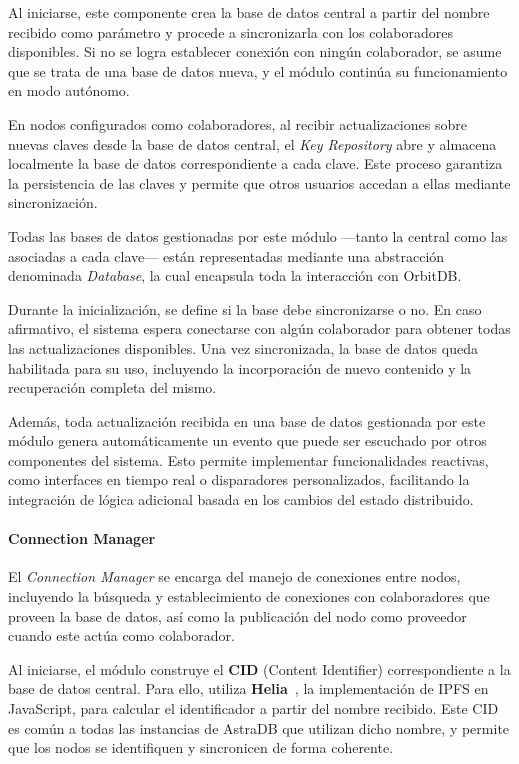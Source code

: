 Al iniciarse, este componente crea la base de datos central a partir del nombre recibido como parámetro y procede a sincronizarla con los colaboradores disponibles. Si no se logra establecer conexión con ningún colaborador, se asume que se trata de una base de datos nueva, y el módulo continúa su funcionamiento en modo autónomo.

En nodos configurados como colaboradores, al recibir actualizaciones sobre nuevas claves desde la base de datos central, el \textit{Key Repository} abre y almacena localmente la base de datos correspondiente a cada clave. Este proceso garantiza la persistencia de las claves y permite que otros usuarios accedan a ellas mediante sincronización.

Todas las bases de datos gestionadas por este módulo —tanto la central como las asociadas a cada clave— están representadas mediante una abstracción denominada \textit{Database}, la cual encapsula toda la interacción con OrbitDB.

Durante la inicialización, se define si la base debe sincronizarse o no. En caso afirmativo, el sistema espera conectarse con algún colaborador para obtener todas las actualizaciones disponibles. Una vez sincronizada, la base de datos queda habilitada para su uso, incluyendo la incorporación de nuevo contenido y la recuperación completa del mismo.

Además, toda actualización recibida en una base de datos gestionada por este módulo genera automáticamente un evento que puede ser escuchado por otros componentes del sistema. Esto permite implementar funcionalidades reactivas, como interfaces en tiempo real o disparadores personalizados, facilitando la integración de lógica adicional basada en los cambios del estado distribuido.

\paragraph{Connection Manager}

El \textit{Connection Manager} se encarga del manejo de conexiones entre nodos, incluyendo la búsqueda y establecimiento de conexiones con colaboradores que proveen la base de datos, así como la publicación del nodo como proveedor cuando este actúa como colaborador.

Al iniciarse, el módulo construye el \textbf{CID} (Content Identifier) correspondiente a la base de datos central. Para ello, utiliza \textbf{Helia}~\cite{helia}, la implementación de IPFS en JavaScript, para calcular el identificador a partir del nombre recibido. Este CID es común a todas las instancias de AstraDB que utilizan dicho nombre, y permite que los nodos se identifiquen y sincronicen de forma coherente.

